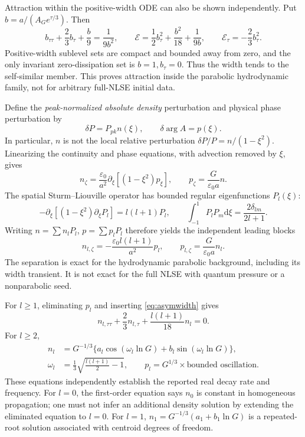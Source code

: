 \documentclass[11pt,a4paper]{article}
\newcommand{\dd}{\mathrm d}
\newcommand{\eps}{\varepsilon}
\begin{document}
Attraction within the positive-width ODE can also be shown independently. Put $b=a/(A_Ge^{\tau/3})$. Then
\begin{equation}
b_{\tau\tau}+\frac23b_\tau+\frac b9=\frac1{9b^2},\qquad
\mathcal E=\frac12b_\tau^2+\frac{b^2}{18}+\frac1{9b},\qquad
\mathcal E_\tau=-\frac23b_\tau^2.
\end{equation}
Positive-width sublevel sets are compact and bounded away from zero, and the only invariant zero-dissipation set is $b=1,b_\tau=0$. Thus the width tends to the self-similar member. This proves attraction inside the parabolic hydrodynamic family, not for arbitrary full-NLSE initial data.

Define the \emph{peak-normalized absolute density} perturbation and physical phase perturbation by
\begin{equation}
\delta P=P_{pk}n(\xi),\qquad \delta\arg A=p(\xi).
\end{equation}
In particular, $n$ is not the local relative perturbation $\delta P/P=n/(1-\xi^2)$. Linearizing the continuity and phase equations, with advection removed by $\xi$, gives
\begin{equation}\label{eq:simlin}
n_\zeta=\frac{\eps_0}{a^2}\partial_\xi[(1-\xi^2)p_\xi],\qquad
p_\zeta=\frac{G}{\eps_0a}n.
\end{equation}
The spatial Sturm--Liouville operator has bounded regular eigenfunctions $P_l(\xi)$:
\begin{equation}
-\partial_\xi[(1-\xi^2)\partial_\xi P_l]=l(l+1)P_l,\qquad
\int_{-1}^1P_lP_m\dd\xi=\frac{2\delta_{lm}}{2l+1}.
\end{equation}
Writing $n=\sum n_lP_l$, $p=\sum p_lP_l$ therefore yields the independent leading blocks
\begin{equation}\label{eq:blocks}
n_{l,\zeta}=-\frac{\eps_0l(l+1)}{a^2}p_l,
\qquad p_{l,\zeta}=\frac{G}{\eps_0a}n_l.
\end{equation}
The separation is exact for the hydrodynamic parabolic background, including its width transient. It is not exact for the full NLSE with quantum pressure or a nonparabolic seed.

For $l\ge1$, eliminating $p_l$ and inserting \eqref{eq:asymwidth} gives
\begin{equation}\label{eq:simode}
n_{l,\tau\tau}+\frac23 n_{l,\tau}+\frac{l(l+1)}{18}n_l=0.
\end{equation}
For $l\ge2$,
\begin{equation}\label{eq:simmodes}
\begin{aligned}
n_l&=G^{-1/3}\{a_l\cos(\omega_l\ln G)+b_l\sin(\omega_l\ln G)\},\\
\omega_l&=\frac13\sqrt{\frac{l(l+1)}2-1},\qquad p_l=G^{1/3}\times\text{bounded oscillation}.
\end{aligned}
\end{equation}
These equations independently establish the reported real decay rate and frequency. For $l=0$, the first-order equation says $n_0$ is constant in homogeneous propagation; one must not infer an additional density solution by extending the eliminated equation to $l=0$. For $l=1$, $n_1=G^{-1/3}(a_1+b_1\ln G)$ is a repeated-root solution associated with centroid degrees of freedom.
\end{document}
